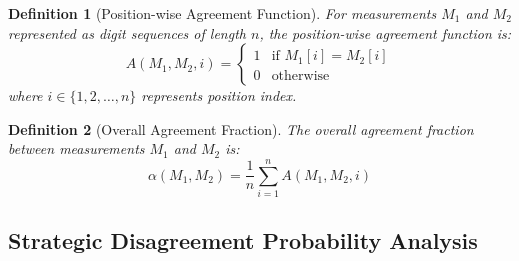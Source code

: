 \documentclass[12pt,a4paper]{article}
\newtheorem{definition}{Definition}
\begin{document}
\begin{definition}[Position-wise Agreement Function]
For measurements $M_1$ and $M_2$ represented as digit sequences of length $n$, the position-wise agreement function is:
\begin{equation}
A(M_1, M_2, i) = \begin{cases}
1 & \text{if } M_1[i] = M_2[i] \\
0 & \text{otherwise}
\end{cases}
\end{equation}
where $i \in \{1, 2, \ldots, n\}$ represents position index.
\end{definition}

\begin{definition}[Overall Agreement Fraction]
The overall agreement fraction between measurements $M_1$ and $M_2$ is:
\begin{equation}
\alpha(M_1, M_2) = \frac{1}{n} \sum_{i=1}^{n} A(M_1, M_2, i)
\end{equation}
\end{definition}

\subsection{Strategic Disagreement Probability Analysis}
\end{document}

